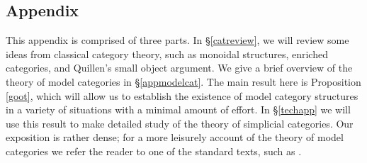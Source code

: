 \documentclass{report}[10pt, final]
\theoremstyle{definition}
\begin{document}
\appendix
\begin{Appendix}
\chapter{Appendix}

\setcounter{theorem}{0}
\setcounter{subsection}{0}

This appendix is comprised of three parts. In \S \ref{catreview}, we will review some ideas from classical category theory, such as monoidal structures, enriched categories, and Quillen's small object argument. We give a brief overview of the theory of model categories in \S \ref{appmodelcat}.
The main result here is Proposition \ref{goot}, which will allow us to establish the existence of model category structures in a variety of situations with a minimal amount of effort. In \S \ref{techapp} we will use this result to make detailed study of the theory of simplicial categories.
Our exposition is rather dense; for a more leisurely account of the theory of model categories we refer the reader to one of the standard texts, such as \cite{hovey}.



\end{Appendix}
\end{document}
